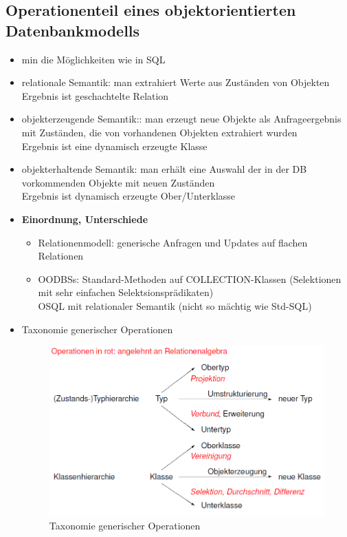 \subsection{Operationenteil eines objektorientierten Datenbankmodells}
\begin{itemize}
	\item min die Möglichkeiten wie in SQL
	\item relationale Semantik: man extrahiert Werte aus Zuständen von Objekten\\
	Ergebnis ist geschachtelte Relation
	\item objekterzeugende Semantik:: man erzeugt neue Objekte als Anfrageergebnis mit Zuständen, die von vorhandenen Objekten extrahiert wurden\\
	Ergebnis ist eine dynamisch erzeugte Klasse
	\item objekterhaltende Semantik: man erhält eine Auswahl der in der DB vorkommenden Objekte mit neuen Zuständen\\
	Ergebnis ist dynamisch erzeugte Ober/Unterklasse
	
	\item \textbf{Einordnung, Unterschiede}
	\begin{itemize}
		\item Relationenmodell: generische Anfragen und Updates auf flachen Relationen
		\item OODBSs: Standard-Methoden auf COLLECTION-Klassen (Selektionen mit sehr einfachen Selektsionsprädikaten)\\
		OSQL mit relationaler Semantik (nicht so mächtig wie Std-SQL)
	\end{itemize}
	
	\item Taxonomie generischer Operationen
	\begin{figure}[!h]
		\centering
		\includegraphics[scale=0.6]{img/taxonomie_generic_ops.png}
		\caption{Taxonomie generischer Operationen}
	\end{figure}
	

\end{itemize}
